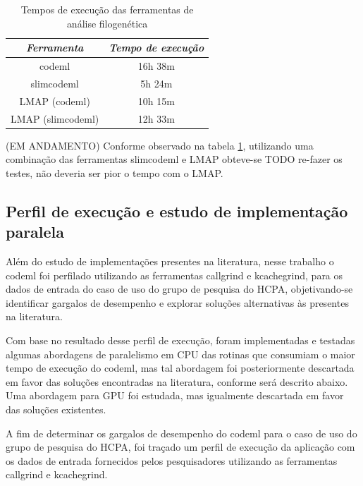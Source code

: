 \documentclass[cic,tc]{iiufrgs}
\begin{document}
\begin{table}[h]
    \caption{Tempos de execução das ferramentas de análise filogenética}
    \centering
        \begin{tabular}{c|c}
          \hline
          \textit{Ferramenta}  &   \textit{Tempo de execução} \\
          \hline
          \hline
          codeml & 16h 38m \\
          slimcodeml & 5h 24m \\
          LMAP (codeml) & 10h 15m \\
          LMAP (slimcodeml) & 12h 33m \\
          \hline
        \end{tabular}
    \label{tbl:paml}
\end{table}

(EM ANDAMENTO) Conforme observado na tabela \ref{tbl:paml}, utilizando uma combinação das
ferramentas slimcodeml e LMAP obteve-se TODO re-fazer os testes, não deveria
ser pior o tempo com o LMAP.

\subsection{Perfil de execução e estudo de implementação paralela}
\label{subsec:codemlpar}

Além do estudo de implementações presentes na literatura, nesse trabalho o
codeml foi perfilado utilizando as ferramentas callgrind e
kcachegrind,\cite{weidendorfer2008sequential} para os dados de entrada do caso
de uso do grupo de pesquisa do HCPA, objetivando-se identificar gargalos de
desempenho e explorar soluções alternativas às presentes na literatura.

Com base no resultado desse perfil de execução, foram implementadas e testadas
algumas abordagens de paralelismo em CPU das rotinas que consumiam o maior
tempo de execução do codeml, mas tal abordagem foi posteriormente descartada em
favor das soluções encontradas na literatura, conforme será descrito abaixo.
Uma abordagem para GPU foi estudada, mas igualmente descartada em favor das
soluções existentes.

A fim de determinar os gargalos de desempenho do codeml para o caso de uso do
grupo de pesquisa do HCPA, foi traçado um perfil de execução da aplicação com
os dados de entrada fornecidos pelos pesquisadores utilizando as
ferramentas callgrind e kcachegrind.\cite{weidendorfer2008sequential}
\end{document}
